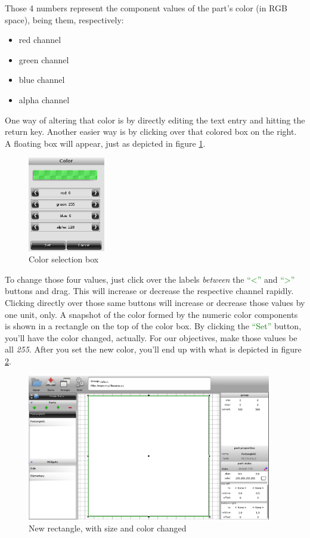 \documentclass[a4paper]{profusion}
\newcommand{\GUIButton}[1]{\textcolor{green}{#1}} %
\begin{document}
Those 4 numbers represent the component values of the part's color (in
RGB space), being them, respectively:

\begin{itemize}
\item red channel
\item green channel
\item blue channel
\item alpha channel
\end{itemize}

One way of altering that color is by directly editing the text entry
and hitting the return key. Another easier way is by clicking over
that colored box on the right. A floating box will appear, just as
depicted in figure \ref{fig:color_box}.

\begin{figure}[h!]
  \centering
  \includegraphics[width=0.3\textwidth]{images/color_box.png}
  \caption{Color selection box}
  \label{fig:color_box}
\end{figure}

To change those four values, just click over the labels \emph{between}
the \GUIButton{``<''} and \GUIButton{``>''} buttons and drag. This
will increase or decrease the respective channel rapidly. Clicking
directly over those same buttons will increase or decrease those
values by one unit, only. A snapshot of the color formed by the
numeric color components is shown in a rectangle on the top of the
color box. By clicking the \GUIButton{``Set''} button, you'll have the
color changed, actually. For our objectives, make those values be
all \emph{255}. After you set the new color, you'll end up with what
is depicted in figure \ref{fig:restack_pre}.

\begin{figure}[h!]
  \centering
  \includegraphics[width=0.95\textwidth]{images/rectangle_stack_pre.png}
  \caption{New rectangle, with size and color changed}
  \label{fig:restack_pre}
\end{figure}
\end{document}
